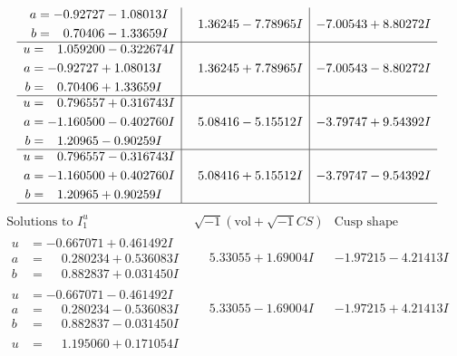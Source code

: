 \documentclass[1p]{elsarticle_modified}
\theoremstyle{definition}
\newcommand{\I}{\sqrt{-1}}
\begin{document}
$$\begin{array}{c|c|c}
\begin{aligned}
a &= -0.92727 - 1.08013 I \\
b &= \phantom{-}0.70406 - 1.33659 I\end{aligned}
 & \phantom{-}1.36245 - 7.78965 I & -7.00543 + 8.80272 I \\ \hline\begin{aligned}
u &= \phantom{-}1.059200 - 0.322674 I \\
a &= -0.92727 + 1.08013 I \\
b &= \phantom{-}0.70406 + 1.33659 I\end{aligned}
 & \phantom{-}1.36245 + 7.78965 I & -7.00543 - 8.80272 I \\ \hline\begin{aligned}
u &= \phantom{-}0.796557 + 0.316743 I \\
a &= -1.160500 - 0.402760 I \\
b &= \phantom{-}1.20965 - 0.90259 I\end{aligned}
 & \phantom{-}5.08416 - 5.15512 I & -3.79747 + 9.54392 I \\ \hline\begin{aligned}
u &= \phantom{-}0.796557 - 0.316743 I \\
a &= -1.160500 + 0.402760 I \\
b &= \phantom{-}1.20965 + 0.90259 I\end{aligned}
 & \phantom{-}5.08416 + 5.15512 I & -3.79747 - 9.54392 I\\
 \hline 
 \end{array}$$\newpage$$\begin{array}{c|c|c}  
\text{Solutions to }I^u_{1}& \I (\text{vol} + \sqrt{-1}CS) & \text{Cusp shape}\\
 \hline 
\begin{aligned}
u &= -0.667071 + 0.461492 I \\
a &= \phantom{-}0.280234 + 0.536083 I \\
b &= \phantom{-}0.882837 + 0.031450 I\end{aligned}
 & \phantom{-}5.33055 + 1.69004 I & -1.97215 - 4.21413 I \\ \hline\begin{aligned}
u &= -0.667071 - 0.461492 I \\
a &= \phantom{-}0.280234 - 0.536083 I \\
b &= \phantom{-}0.882837 - 0.031450 I\end{aligned}
 & \phantom{-}5.33055 - 1.69004 I & -1.97215 + 4.21413 I \\ \hline\begin{aligned}
u &= \phantom{-}1.195060 + 0.171054 I \\

\end{aligned}
\end{array}$$
\end{document}
